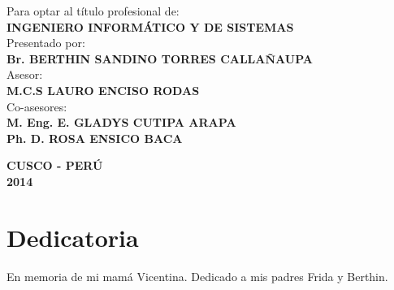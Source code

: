 \documentclass[12pt,oneside,a4paper]{book}
\theoremstyle{definition}
\begin{document}
\begin{center}
\begin{minipage}{\linewidth}
  \large
  \centering    
  \begin{minipage}{0.45\linewidth}
  \end{minipage}
  \hspace{0.28\linewidth}
  \begin{minipage}{0.7\linewidth}
    \begin{normalsize}
    Para optar al título profesional de:
    \vspace*{-0.1in}
    \\\textbf{INGENIERO INFORMÁTICO Y DE SISTEMAS}\\
    Presentado por: \vspace*{-0.1in}
    \\\textbf{Br. BERTHIN SANDINO TORRES CALLAÑAUPA}\\
    Asesor: \vspace*{-0.1in}
    \\\textbf{M.C.S LAURO ENCISO RODAS}\\
    Co-asesores: \vspace*{-0.1in}
    \\\textbf{M. Eng. E. GLADYS CUTIPA ARAPA} \vspace*{-0.1in}
    \\\textbf{Ph. D. ROSA ENSICO BACA}
    \end{normalsize}
  \end{minipage}
\end{minipage}

\vspace*{0.5in}
\textbf{CUSCO - PERÚ} \\
\textbf{2014}
\end{center}


\chapter*{Dedicatoria}
En memoria de mi mamá Vicentina. Dedicado a mis padres Frida y Berthin.
\end{document}
